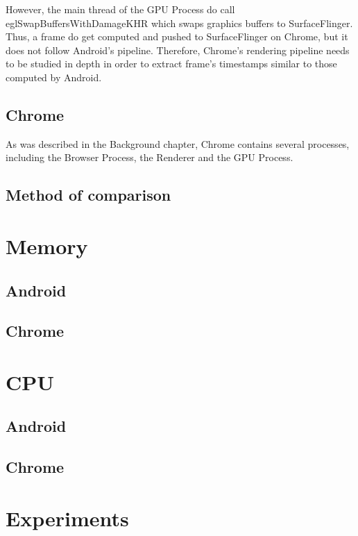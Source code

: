 \documentclass{kththesis}
\begin{document}
    However, the main thread of the GPU Process do call eglSwapBuffersWithDamageKHR which swaps graphics buffers to SurfaceFlinger. Thus, a frame do get computed and pushed to SurfaceFlinger on Chrome, but it does not follow Android's pipeline. Therefore, Chrome's rendering pipeline needs to be studied in depth in order to extract frame's timestamps similar to those computed by Android. 
    
    
    \subsection{Chrome}
    
    As was described in the Background chapter, Chrome contains several processes, including the Browser Process, the Renderer and the GPU Process. 
    
        
        
    \subsection{Method of comparison}
\section{Memory}
    \subsection{Android}
    \subsection{Chrome}
\section{CPU}
    \subsection{Android}
    \subsection{Chrome}
\section{Experiments}
\end{document}
